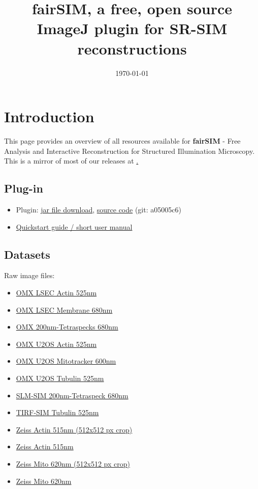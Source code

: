 \documentclass[twoside=false,
           a4paper,
           10pt,DIV=16]{article}
\title{fairSIM, a free, open source ImageJ plugin for SR-SIM reconstructions}
\date{\small \today}
\begin{document}
\maketitle

\section*{Introduction}
This page provides an overview of all resources available
for \textbf{fairSIM}  - Free Analysis and Interactive Reconstruction for Structured Illumination Microscopy. This is a mirror of most of our releases at \href{https://github.com/fairsim}.

\subsection*{Plug-in}
\begin{itemize}
\item Plugin: 
\href{fairSIM_plugin.jar}{jar file download},
\href{fairSIM-source.tar.bz2}{source code} (git: a05005c6)
\item
\href{fairSIM-quickstart.pdf}{Quickstart guide / short user manual}
\end{itemize}


\subsection*{Datasets}

Raw image files:
\begin{itemize}
\item \href{data/OMX_LSEC_Actin_525nm.tif}{OMX LSEC Actin 525nm}
\item \href{data/OMX_LSEC_Membrane_680nm.tif}{OMX LSEC Membrane 680nm}
\item \href{data/OMX_Tetraspeck200_680nm.tif}{OMX 200nm-Tetraspecks 680nm}
\item \href{data/OMX_U2OS_Actin_525nm.tif}{OMX U2OS Actin 525nm}
\item \href{data/OMX_U2OS_Mitotracker_600nm.tif}{OMX U2OS Mitotracker 600nm}
\item \href{data/OMX_U2OS_Tubulin_525nm.tif}{OMX U2OS Tubulin 525nm}
\item \href{data/SLM-SIM_Tetraspeck200_680nm.tif}{SLM-SIM 200nm-Tetraspeck 680nm}
\item \href{data/TIRF_Tubulin_525nm.tif}{TIRF-SIM Tubulin 525nm}
\item \href{data/Zeiss_Actin_525nm_crop.tif}{Zeiss Actin 515nm (512x512 px crop)}
\item \href{data/Zeiss_Actin_525nm_large.tif}{Zeiss Actin 515nm}
\item \href{data/Zeiss_Mito_600nm_crop.tif}{Zeiss Mito 620nm (512x512 px crop)}
\item \href{data/Zeiss_Mito_600nm_large.tif}{Zeiss Mito 620nm}
\end{itemize}
\end{document}
